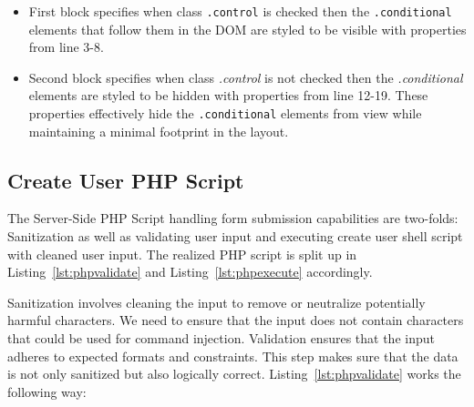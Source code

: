 \begin{itemize}
    \item First block specifies when class \texttt{.control} is checked then the
    \texttt{.conditional} elements that follow them in the DOM are styled to be
    visible with properties from line 3-8. 
    \item Second block specifies when class \textit{.control} is not checked
    then the \textit{.conditional} elements are styled to be hidden with
    properties from line 12-19. These properties effectively hide the
    \texttt{.conditional} elements from view while maintaining a minimal
    footprint in the
    layout.
\end{itemize}

\subsection{Create User PHP Script}

The Server-Side PHP Script handling form submission capabilities are two-folds:
Sanitization as well as validating user input and executing create user shell
script with cleaned user input. The realized PHP script is split up in
Listing~\ref{lst:phpvalidate} and Listing~\ref{lst:phpexecute} accordingly.

Sanitization involves cleaning the input to remove or neutralize potentially
harmful characters. We need to ensure that the input does not contain characters
that could be used for command injection. Validation ensures that the input
adheres to expected formats and constraints. This step makes sure that the data
is not only sanitized but also logically correct. Listing~\ref{lst:phpvalidate}
works the following way:



